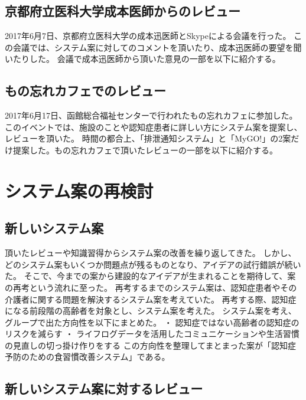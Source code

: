 \documentclass[../report]{subfiles}
\begin{document}
\subsection{京都府立医科大学成本医師からのレビュー}
2017年6月7日、京都府立医科大学の成本迅医師とSkypeによる会議を行った。
この会議では、システム案に対してのコメントを頂いたり、成本迅医師の要望を聞いたりした。
会議で成本迅医師から頂いた意見の一部を以下に紹介する。

\subsection{もの忘れカフェでのレビュー}
2017年6月17日、函館総合福祉センターで行われたもの忘れカフェに参加した。
このイベントでは、施設のことや認知症患者に詳しい方にシステム案を提案し、レビューを頂いた。
時間の都合上、「排泄通知システム」と「MyGO!」の2案だけ提案した。もの忘れカフェで頂いたレビューの一部を以下に紹介する。


\section{システム案の再検討}
\subsection{新しいシステム案}
頂いたレビューや知識習得からシステム案の改善を繰り返してきた。
しかし、どのシステム案もいくつか問題点が残るものとなり、アイデアの試行錯誤が続いた。
そこで、今までの案から建設的なアイデアが生まれることを期待して、案の再考という流れに至った。
再考するまでのシステム案は、認知症患者やその介護者に関する問題を解決するシステム案を考えていた。
再考する際、認知症になる前段階の高齢者を対象とし、システム案を考えた。
システム案を考え、グループで出た方向性を以下にまとめた。
・      認知症ではない高齢者の認知症のリスクを減らす
・      ライフログデータを活用したコミュニケーションや生活習慣の見直しの切っ掛け作りをする
この方向性を整理してまとまった案が「認知症予防のための食習慣改善システム」である。

\subsection{新しいシステム案に対するレビュー}
\end{document}
